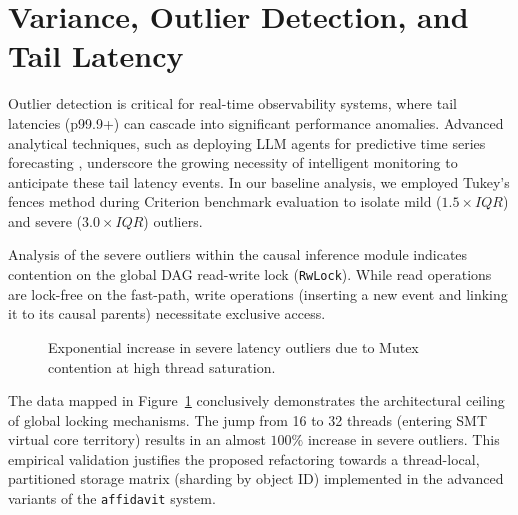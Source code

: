 \section{Variance, Outlier Detection, and Tail Latency}
\label{sec:eval_variance}

Outlier detection is critical for real-time observability systems, where tail latencies (p99.9+) can cascade into significant performance anomalies. Advanced analytical techniques, such as deploying LLM agents for predictive time series forecasting \cite{ref_BridgingtheLast47}, underscore the growing necessity of intelligent monitoring to anticipate these tail latency events. In our baseline analysis, we employed Tukey's fences method during Criterion benchmark evaluation to isolate mild ($1.5 \times IQR$) and severe ($3.0 \times IQR$) outliers.

Analysis of the severe outliers within the causal inference module indicates contention on the global DAG read-write lock (\texttt{RwLock}). While read operations are lock-free on the fast-path, write operations (inserting a new event and linking it to its causal parents) necessitate exclusive access.

\begin{figure}[htbp]
\centering
{}
\caption{Exponential increase in severe latency outliers due to Mutex contention at high thread saturation.}
\label{fig:outliers}
\end{figure}

The data mapped in Figure~\ref{fig:outliers} conclusively demonstrates the architectural ceiling of global locking mechanisms. The jump from 16 to 32 threads (entering SMT virtual core territory) results in an almost $100\%$ increase in severe outliers. This empirical validation justifies the proposed refactoring towards a thread-local, partitioned storage matrix (sharding by object ID) implemented in the advanced variants of the \texttt{affidavit} system.

